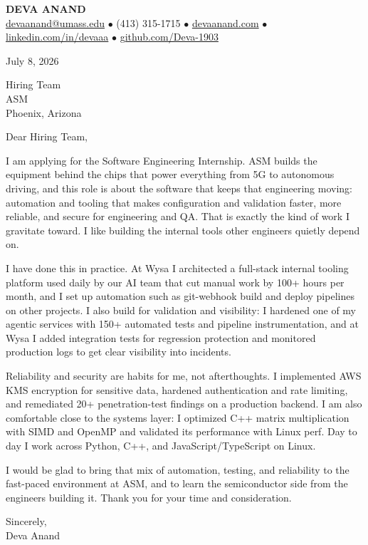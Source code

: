 \documentclass[letterpaper,11pt]{article}
\begin{document}
\begin{center}
    {\fontsize{18}{20}\selectfont\bfseries DEVA ANAND}\\ \vspace{3pt}
    {\small
    \href{mailto:devaanand@umass.edu}{devaanand@umass.edu}
    \enspace$\bullet$\enspace
    (413) 315-1715
    \enspace$\bullet$\enspace
    \href{https://devaanand.com}{devaanand.com}
    \enspace$\bullet$\enspace
    \href{https://linkedin.com/in/devaaa/}{linkedin.com/in/devaaa}
    \enspace$\bullet$\enspace
    \href{https://github.com/Deva-1903}{github.com/Deva-1903}}
\end{center}

\vspace{6pt}

July 8, 2026

Hiring Team \\
ASM \\
Phoenix, Arizona

\vspace{2pt}

Dear Hiring Team,

I am applying for the Software Engineering Internship. ASM builds the equipment behind the chips that power everything from 5G to autonomous driving, and this role is about the software that keeps that engineering moving: automation and tooling that makes configuration and validation faster, more reliable, and secure for engineering and QA. That is exactly the kind of work I gravitate toward. I like building the internal tools other engineers quietly depend on.

I have done this in practice. At Wysa I architected a full-stack internal tooling platform used daily by our AI team that cut manual work by 100+ hours per month, and I set up automation such as git-webhook build and deploy pipelines on other projects. I also build for validation and visibility: I hardened one of my agentic services with 150+ automated tests and pipeline instrumentation, and at Wysa I added integration tests for regression protection and monitored production logs to get clear visibility into incidents.

Reliability and security are habits for me, not afterthoughts. I implemented AWS KMS encryption for sensitive data, hardened authentication and rate limiting, and remediated 20+ penetration-test findings on a production backend. I am also comfortable close to the systems layer: I optimized C++ matrix multiplication with SIMD and OpenMP and validated its performance with Linux perf. Day to day I work across Python, C++, and JavaScript/TypeScript on Linux.

I would be glad to bring that mix of automation, testing, and reliability to the fast-paced environment at ASM, and to learn the semiconductor side from the engineers building it. Thank you for your time and consideration.

\vspace{6pt}

Sincerely, \\
Deva Anand
\end{document}
